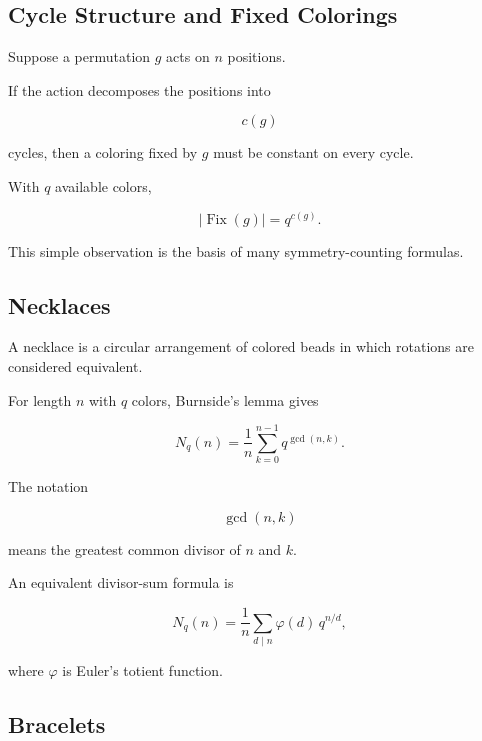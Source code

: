 \subsection{Cycle Structure and Fixed Colorings}
\label{subsec:cycle-structure-fixed-colorings}

Suppose a permutation \(g\) acts on \(n\) positions.

If the action decomposes the positions into

\[
c(g)
\]

cycles, then a coloring fixed by \(g\) must be constant on every cycle.

With \(q\) available colors,

\[
\boxed{
|\operatorname{Fix}(g)|
=
q^{c(g)}.
}
\]

This simple observation is the basis of many symmetry-counting formulas.

\subsection{Necklaces}
\label{subsec:necklaces}

A necklace is a circular arrangement of colored beads in which
rotations are considered equivalent.

For length \(n\) with \(q\) colors, Burnside's lemma gives

\[
\boxed{
N_q(n)
=
\frac1n
\sum_{k=0}^{n-1}
q^{\gcd(n,k)}.
}
\]

The notation

\[
\gcd(n,k)
\]

means the greatest common divisor of \(n\) and \(k\).

An equivalent divisor-sum formula is

\[
\boxed{
N_q(n)
=
\frac1n
\sum_{d\mid n}
\varphi(d)\,
q^{n/d},
}
\]

where \(\varphi\) is Euler's totient function.

\subsection{Bracelets}
\label{subsec:bracelets}

